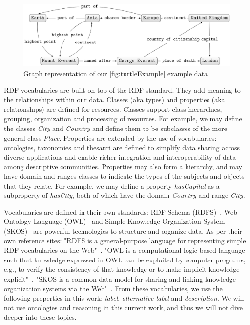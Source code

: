\begin{figure}[h!]
    \centering
        \includegraphics[width=.9\linewidth]{imagenes/exampleGrapha.png}
        \caption{Graph representation of our \autoref{fig:turtleExample} example data~\cite{Moreno2018}}
        \label{fig:bobMarleyExampleGraph}
\end{figure}

RDF vocabularies are built on top of the RDF standard. They add meaning to the relationships within our data. Classes (aka types) and properties (aka relationships) are defined for resources. Classes support class hierarchies, grouping, organization and processing of resources. For example, we may define the classes \textit{City} and \textit{Country} and define them to be subclasses of the more general class \textit{Place}. Properties are extended by the use of vocabularies: ontologies, taxonomies and thesauri are defined to simplify data sharing across diverse applications and enable richer integration and interoperability of data among descriptive communities. Properties may also form a hierarchy, and may have domain and ranges classes to indicate the types of the subjects and objects that they relate. For example, we may define a property \textit{hasCapital} as a subproperty of \textit{hasCity}, both of which have the domain \textit{Country} and range \textit{City}.

Vocabularies are defined in their own standards: RDF Schema (RDFS)~\cite{RDFS}, Web Ontology Language (OWL)~\cite{OWL} and Simple Knowledge Organization System (SKOS)~\cite{SKOS} are powerful technologies to structure and organize data. As per their own reference sites: "RDFS is a general-purpose language for representing simple RDF vocabularies on the Web"~\cite{RDFS}. "OWL is a computational logic-based language such that knowledge expressed in OWL can be exploited by computer programs, e.g., to verify the consistency of that knowledge or to make implicit knowledge explicit"~\cite{OWL}. "SKOS is a common data model for sharing and linking knowledge organization systems via the Web"~\cite{SKOS}. From these vocabularies, we use the following properties in this work: \textit{label}, \textit{alternative label} and \textit{description}. We will not use ontologies and reasoning in this current work, and thus we will not dive deeper into these topics.

